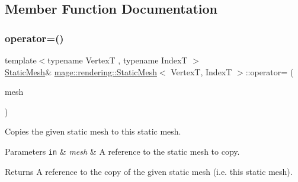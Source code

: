 \subsection{Member Function Documentation}
\mbox{\label{classmage_1_1rendering_1_1_static_mesh_a62f007ca9d1dc316519468fb7b74af19}} 
\subsubsection{\texorpdfstring{operator=()}{operator=()}\hspace{0.1cm}{\footnotesize\ttfamily [1/2]}}
{\footnotesize\ttfamily template$<$typename VertexT , typename IndexT $>$ \\
\mbox{\hyperlink{classmage_1_1rendering_1_1_static_mesh}{Static\+Mesh}}\& \mbox{\hyperlink{classmage_1_1rendering_1_1_static_mesh}{mage\+::rendering\+::\+Static\+Mesh}}$<$ VertexT, IndexT $>$\+::operator= (\begin{DoxyParamCaption}\item[{const \mbox{\hyperlink{classmage_1_1rendering_1_1_static_mesh}{Static\+Mesh}}$<$ VertexT, IndexT $>$ \&}]{mesh }\end{DoxyParamCaption})\hspace{0.3cm}{\ttfamily [delete]}}

Copies the given static mesh to this static mesh.


\begin{DoxyParams}[1]{Parameters}
\mbox{\tt in}  & {\em mesh} & A reference to the static mesh to copy. \\
\hline
\end{DoxyParams}
\begin{DoxyReturn}{Returns}
A reference to the copy of the given static mesh (i.\+e. this static mesh). 
\end{DoxyReturn}
\mbox{\label{classmage_1_1rendering_1_1_static_mesh_ab4b3e0d32af550bf440cc2aaf731a350}} 
